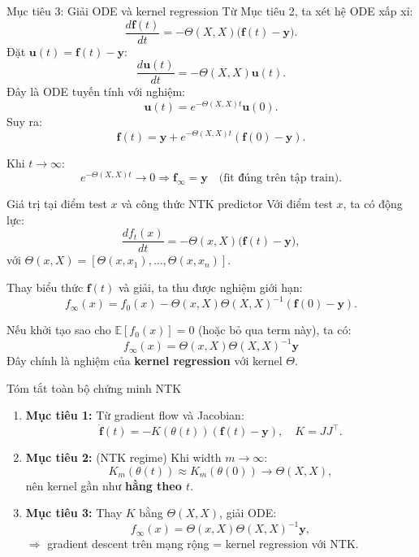 \documentclass[12pt]{beamer}
\begin{document}
\begin{frame}{Mục tiêu 3: Giải ODE và kernel regression}
  Từ Mục tiêu 2, ta xét hệ ODE xấp xỉ:
  \[
    \frac{d\mathbf f(t)}{dt}
    = -\Theta(X,X)\big(\mathbf f(t) - \mathbf y\big).
  \]
  Đặt $\mathbf u(t) = \mathbf f(t) - \mathbf y$:
  \[
    \frac{d\mathbf u(t)}{dt}
    = -\Theta(X,X)\mathbf u(t).
  \]
  Đây là ODE tuyến tính với nghiệm:
  \[
    \mathbf u(t)
    = e^{-\Theta(X,X)t}\mathbf u(0).
  \]
  Suy ra:
  \[
    \mathbf f(t)
    = \mathbf y + e^{-\Theta(X,X)t}(\mathbf f(0) - \mathbf y).
  \]

  Khi $t \to \infty$:
  \[
    e^{-\Theta(X,X)t} \to 0
    \Rightarrow
    \mathbf f_\infty = \mathbf y
    \quad \text{(fit đúng trên tập train)}.
  \]
\end{frame}

\begin{frame}{Giá trị tại điểm test $x$ và công thức NTK predictor}
  Với điểm test $x$, ta có động lực:
  \[
    \frac{df_t(x)}{dt}
    = -\Theta(x,X)\big(\mathbf f(t) - \mathbf y\big),
  \]
  với
  \(
    \Theta(x,X) = [\Theta(x,x_1),\dots,\Theta(x,x_n)].
  \)

  Thay biểu thức $\mathbf f(t)$ và giải, ta thu được nghiệm giới hạn:
  \[
    f_\infty(x)
    = f_0(x) - \Theta(x,X)\Theta(X,X)^{-1}(\mathbf f(0) - \mathbf y).
  \]

  Nếu khởi tạo sao cho $\mathbb E[f_0(x)]=0$ (hoặc bỏ qua term này), ta có:
  \[
    \boxed{
    f_\infty(x)
    = \Theta(x,X)\Theta(X,X)^{-1}\mathbf y
    }
  \]
  Đây chính là nghiệm của \textbf{kernel regression} với kernel $\Theta$.
\end{frame}

\begin{frame}{Tóm tắt toàn bộ chứng minh NTK}
  \begin{enumerate}
    \item \textbf{Mục tiêu 1:}  
          Từ gradient flow và Jacobian:
          \[
            \dot{\mathbf f}(t)
            = -K(\theta(t))(\mathbf f(t)-\mathbf y),
            \quad K = JJ^\top.
          \]
    \item \textbf{Mục tiêu 2:} (NTK regime)  
          Khi width $m\to\infty$:
          \[
            K_m(\theta(t)) \approx K_m(\theta(0)) \to \Theta(X,X),
          \]
          nên kernel gần như \textbf{hằng theo $t$}.
    \item \textbf{Mục tiêu 3:}  
          Thay $K$ bằng $\Theta(X,X)$, giải ODE:
          \[
            f_\infty(x)
            = \Theta(x,X)\Theta(X,X)^{-1}\mathbf y,
          \]
          $\Rightarrow$ gradient descent trên mạng rộng = kernel regression với NTK.
  \end{enumerate}
\end{frame}
\end{document}

